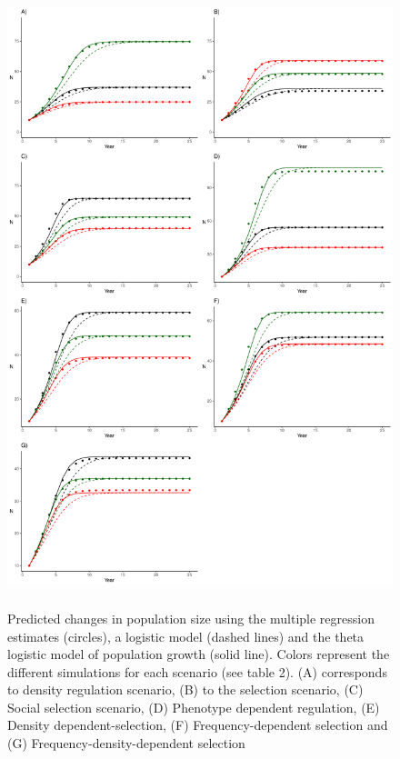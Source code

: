 \documentclass{article}
\begin{document}
\begin{figure}[h] 
	\centering
	\includegraphics[width=12cm, height=18cm]{Figures/FigS4.pdf}
	\caption{Predicted changes in population size using the multiple regression estimates (circles), a logistic model (dashed lines) and the theta logistic model of population growth (solid line). Colors represent the different simulations for each scenario (see table 2). (A) corresponds to density regulation scenario, (B) to the selection scenario, (C) Social selection scenario, (D) Phenotype dependent regulation, (E) Density dependent-selection, (F) Frequency-dependent selection and (G) Frequency-density-dependent selection} 
	\label{fig:growth}
\end{figure}


 
\end{document}
